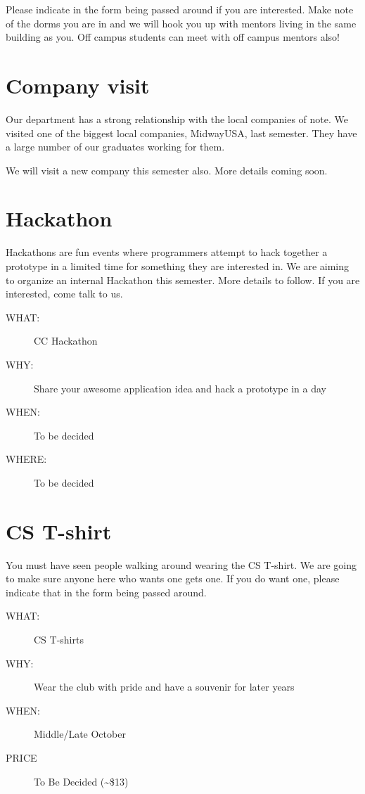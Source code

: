 Please indicate in the form being passed around if you are interested. Make
note of the dorms you are in and we will hook you up with mentors living in the
same building as you. Off campus students can meet with off campus mentors
also!


\section{Company visit}
\label{sec:orgheadline11}

Our department has a strong relationship with the local companies of note. We
visited one of the biggest local companies, MidwayUSA, last semester. They have
a large number of our graduates working for them.

We will visit a new company this semester also. More details coming soon.


\section{Hackathon}
\label{sec:orgheadline12}

Hackathons are fun events where programmers attempt to hack together a
prototype in a limited time for something they are interested in. We are aiming
to organize an internal Hackathon this semester. More details to follow. If you
are interested, come talk to us.

\begin{description}
\item[{WHAT:}] CC Hackathon
\item[{WHY:}] Share your awesome application idea and hack a prototype in a day
\item[{WHEN:}] To be decided
\item[{WHERE:}] To be decided
\end{description}


\section{CS T-shirt}
\label{sec:orgheadline13}

You must have seen people walking around wearing the CS T-shirt. We are going
to make sure anyone here who wants one gets one. If you do want one, please
indicate that in the form being passed around.

\begin{description}
\item[{WHAT:}] CS T-shirts
\item[{WHY:}] Wear the club with pride and have a souvenir for later years
\item[{WHEN:}] Middle/Late October
\item[{PRICE}] To Be Decided (\textasciitilde{}\$13)
\end{description}


